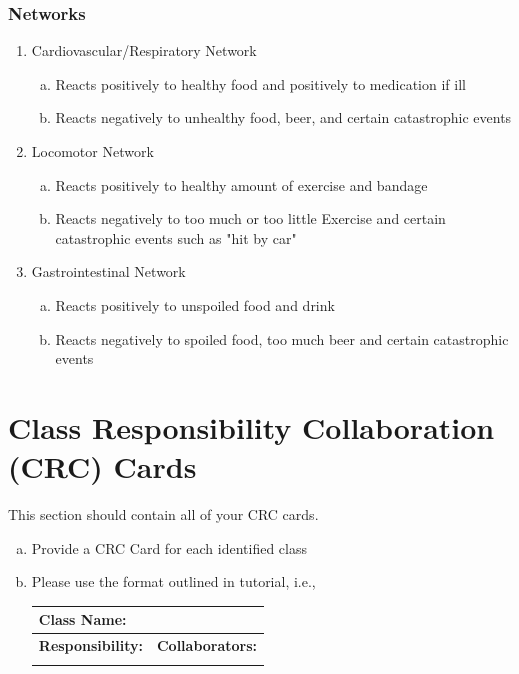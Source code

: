 \documentclass[]{article}
\begin{document}
\subsubsection{Networks}
\begin{enumerate}[1)]
	\item Cardiovascular/Respiratory Network
		\begin{enumerate}[a)]
			\item Reacts positively to healthy food and positively to medication if ill
			\item Reacts negatively to unhealthy food, beer, and certain catastrophic events
		\end{enumerate}
	\item Locomotor Network
		\begin{enumerate}[a)]
			\item Reacts positively to healthy amount of exercise and bandage
			\item Reacts negatively to too much or too little Exercise and certain catastrophic events such as "hit by car"
		\end{enumerate}
	\item Gastrointestinal Network
		\begin{enumerate}[a)]
			\item Reacts positively to unspoiled food and drink
			\item Reacts negatively to spoiled food, too much beer and certain catastrophic events
		\end{enumerate}
\end{enumerate}


	
\section{Class Responsibility Collaboration (CRC) Cards}
\label{sec:class_responsibility_collaboration_crc_cards}
This section should contain all of your CRC cards.

\begin{enumerate}[a)]
	\item Provide a CRC Card for each identified class
	\item Please use the format outlined in tutorial, i.e., 
	\begin{table}[ht]
		\centering
		\begin{tabular}{|p{5cm}|p{5cm}|}
		\hline 
		 \multicolumn{2}{|l|}{\textbf{Class Name:}} \\
		\hline
		\textbf{Responsibility:} & \textbf{Collaborators:} \\
		\hline
		\vspace{1in} & \\
		\hline
		\end{tabular}
	\end{table}
	
\end{enumerate}
\end{document}
